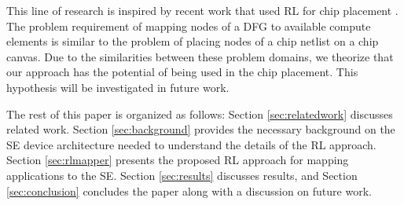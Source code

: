 This line of research is inspired by recent work that used RL for chip placement \cite{mirhoseini2020chip}.
The problem requirement of mapping nodes of a DFG to available compute elements is similar to the problem of placing nodes of a chip netlist on a chip canvas. 
Due to the similarities between these problem domains, we theorize that our approach has the potential of being used in the chip placement.
This hypothesis will be investigated in future work.

The rest of this paper is organized as follows: 
Section \ref{sec:relatedwork} discusses related work.
Section \ref{sec:background} provides the necessary background on the SE device architecture needed to understand the details of the RL approach.
Section \ref{sec:rlmapper} presents the proposed RL approach for mapping applications to the SE.
Section \ref{sec:results} discusses results, and Section \ref{sec:conclusion} concludes the paper along with a discussion on future work.